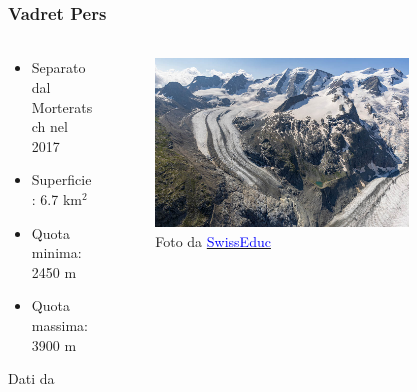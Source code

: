 \begin{frame}
  \frametitle{Vadret Pers}
  \framesubtitle{}

  \begin{columns}
      \begin{column}{0.5\textwidth}
          \begin{itemize}[itemsep=0.5em, label=$\bullet$]
              \item Separato dal Morteratsch nel 2017
              \item Superficie: 6.7 km$^2$
              \item Quota minima: 2450 m
              \item Quota massima: 3900 m
          \end{itemize}
          \vspace{12pt}

          Dati da 
      \end{column}
      
      \begin{column}{0.5\textwidth}
      \begin{figure}
          \includegraphics[width=0.8\textwidth]{Immagini/vadretPers.jpg}
          \caption{Foto da \href{https://www.swisseduc.ch/glaciers/morteratsch/2021/index-en.html}{\textcolor{blue}{SwissEduc}}}
        \end{figure}
      \end{column}
    \end{columns}

\end{frame}